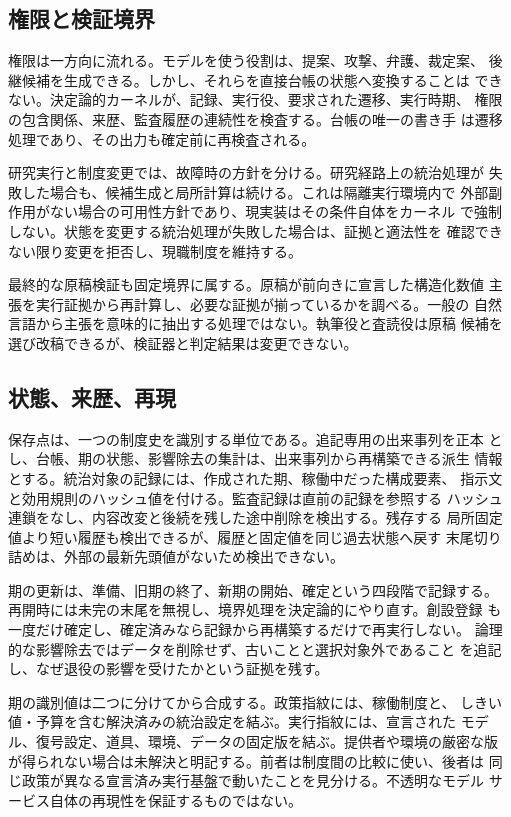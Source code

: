 \subsection{権限と検証境界}\label{sec:overview:verification}

権限は一方向に流れる。モデルを使う役割は、提案、攻撃、弁護、裁定案、
後継候補を生成できる。しかし、それらを直接台帳の状態へ変換することは
できない。決定論的カーネルが、記録、実行役、要求された遷移、実行時期、
権限の包含関係、来歴、監査履歴の連続性を検査する。台帳の唯一の書き手
は遷移処理であり、その出力も確定前に再検査される。

研究実行と制度変更では、故障時の方針を分ける。研究経路上の統治処理が
失敗した場合も、候補生成と局所計算は続ける。これは隔離実行環境内で
外部副作用がない場合の可用性方針であり、現実装はその条件自体をカーネル
で強制しない。状態を変更する統治処理が失敗した場合は、証拠と適法性を
確認できない限り変更を拒否し、現職制度を維持する。

最終的な原稿検証も固定境界に属する。原稿が前向きに宣言した構造化数値
主張を実行証拠から再計算し、必要な証拠が揃っているかを調べる。一般の
自然言語から主張を意味的に抽出する処理ではない。執筆役と査読役は原稿
候補を選び改稿できるが、検証器と判定結果は変更できない。

\subsection{状態、来歴、再現}\label{sec:overview:checkpoint}

保存点は、一つの制度史を識別する単位である。追記専用の出来事列を正本
とし、台帳、期の状態、影響除去の集計は、出来事列から再構築できる派生
情報とする。統治対象の記録には、作成された期、稼働中だった構成要素、
指示文と効用規則のハッシュ値を付ける。監査記録は直前の記録を参照する
ハッシュ連鎖をなし、内容改変と後続を残した途中削除を検出する。残存する
局所固定値より短い履歴も検出できるが、履歴と固定値を同じ過去状態へ戻す
末尾切り詰めは、外部の最新先頭値がないため検出できない。

期の更新は、準備、旧期の終了、新期の開始、確定という四段階で記録する。
再開時には未完の末尾を無視し、境界処理を決定論的にやり直す。創設登録
も一度だけ確定し、確定済みなら記録から再構築するだけで再実行しない。
論理的な影響除去ではデータを削除せず、古いことと選択対象外であること
を追記し、なぜ退役の影響を受けたかという証拠を残す。

期の識別値は二つに分けてから合成する。政策指紋には、稼働制度と、
しきい値・予算を含む解決済みの統治設定を結ぶ。実行指紋には、宣言された
モデル、復号設定、道具、環境、データの固定版を結ぶ。提供者や環境の厳密な版
が得られない場合は未解決と明記する。前者は制度間の比較に使い、後者は
同じ政策が異なる宣言済み実行基盤で動いたことを見分ける。不透明なモデル
サービス自体の再現性を保証するものではない。


